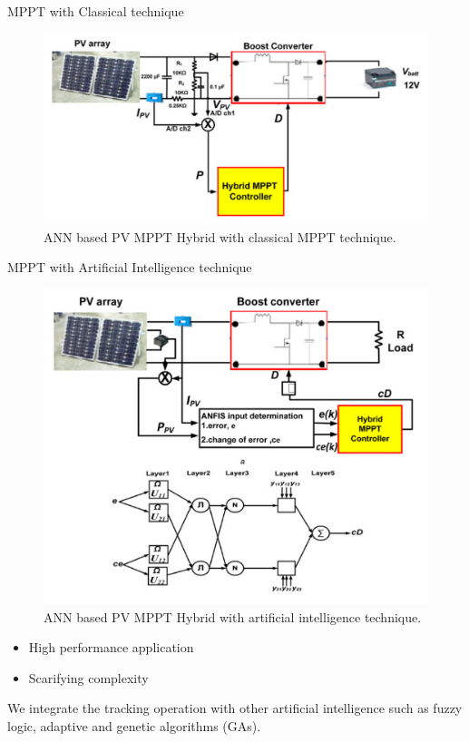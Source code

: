 \documentclass[10pt]{beamer}
\begin{document}
\begin{frame}{MPPT with Classical technique}
\begin{figure}
	\centerline{\includegraphics[scale=0.2]{hybridclassical.png}}
    \caption{ANN based PV MPPT Hybrid with classical MPPT technique.}
    \label{fig:hybridclassical}
\end{figure}
\end{frame}

\begin{frame}{MPPT with Artificial Intelligence technique}
\begin{figure}
	\centerline{\includegraphics[scale=0.15]{hybridann.png}}
	\caption{ANN based PV MPPT Hybrid with artificial intelligence technique.}
    \label{fig:hybridann}
\end{figure}
\vspace{-1cm}
\begin{itemize}
	\item{High performance application}
    \item{Scarifying complexity}
\end{itemize}
We integrate the tracking operation with other artificial intelligence such as fuzzy logic, adaptive and genetic algorithms (GAs).
\end{frame}
\end{document}

